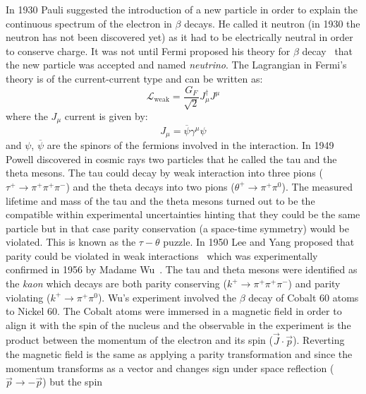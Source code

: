 In 1930 Pauli suggested the introduction of a new particle in order to explain
the continuous spectrum of the electron in $\beta$ decays. He called it neutron
(in 1930 the neutron has not been discovered yet) as it had to be electrically
neutral in order to conserve charge. It was not until Fermi proposed his theory
for $\beta$ decay~\cite{FermiTheory} that the new particle was accepted and
named \emph{neutrino}. The Lagrangian in Fermi's theory is of the
current-current type and can be written as:
\begin{equation}
  \mathcal{L}_\mathrm{weak} = \frac{G_F}{\sqrt{2}} J_\mu^\dagger
  J^\mu
  \label{eq:150}
\end{equation}
where the $J_\mu$ current is given by:
\begin{equation}
  \label{eq:151}
  J_\mu = \overbar{\psi} \gamma^\mu \psi
\end{equation}
and $\psi$, $\overbar{\psi}$ are the spinors of the fermions involved in the
interaction. In 1949 Powell discovered in cosmic rays two particles that he
called the tau and the theta mesons. The tau could decay by weak interaction
into three pions ($\tau^+ \rightarrow \pi^+ \pi^+ \pi^-$) and the theta decays
into two pions ($\theta^+ \rightarrow \pi^+ \pi^0$). The measured lifetime and
mass of the tau and the theta mesons turned out to be the compatible within
experimental uncertainties hinting that they could be the same particle but in
that case parity conservation (a space-time symmetry) would be violated. This is
known as the $\tau - \theta$ puzzle. In 1950 Lee and Yang proposed that parity
could be violated in weak interactions~\cite{LeeYangParityViolation} which was
experimentally confirmed in 1956 by Madame Wu~\cite{WuExperiment}. The tau and
theta mesons were identified as the \emph{kaon} which decays are both parity
conserving ($k^+ \rightarrow \pi^+ \pi^+ \pi^-$) and parity violating
($k^+ \rightarrow \pi^+ \pi^0$). Wu's experiment involved the $\beta$ decay of
Cobalt 60 atoms to Nickel 60. The Cobalt atoms were immersed in a magnetic field
in order to align it with the spin of the nucleus and the observable in the
experiment is the product between the momentum of the electron and its spin
($\vec{J} \cdot \vec{p}$). Reverting the magnetic field is the same as applying
a parity transformation and since the momentum transforms as a vector and
changes sign under space reflection ($\vec{p} \to - \vec{p}$) but the spin
